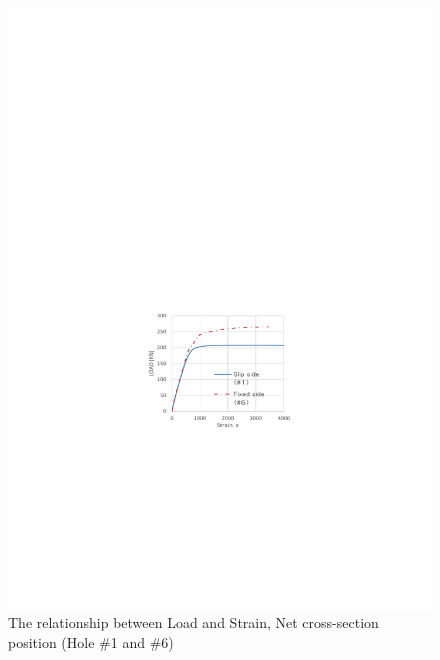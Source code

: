 \begin{figure}[htbp]
    \centering
    \begin{minipage}[t]{0.48\textwidth}
    \includegraphics[width=\linewidth]{imgs/ch3/fig3-21.pdf}
    \caption{The relationship between Load and Strain, Net cross-section position (Hole \#1 and \#6)}
    \label{fig3-21}
    \end{minipage}
    \begin{minipage}[t]{0.48\textwidth}

\end{minipage}
\end{figure}
